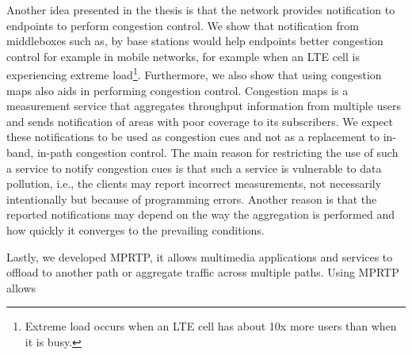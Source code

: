 Another idea presented in the thesis is that the network provides notification
to endpoints to perform congestion control. We show that notification from
middleboxes such as, by base stations would help endpoints better congestion
control for example in mobile networks, for example when an LTE cell is
experiencing extreme load\footnote{Extreme load occurs when an LTE cell has
about 10x more users than when it is busy.}. Furthermore, we also show that
using congestion maps also aids in performing congestion control. Congestion
maps is a measurement service that aggregates throughput information from
multiple users and sends notification of areas with poor coverage to its
subscribers. We expect these notifications to be used as congestion cues and
not as a replacement to in-band, in-path congestion control. The main reason
for restricting the use of such a service to notify congestion cues is that
such a service is vulnerable to data pollution, i.e., the clients may report
incorrect measurements, not necessarily intentionally but because of
programming errors. Another reason is that the reported notifications may
depend on the way the aggregation is performed and how quickly it converges to
the prevailing conditions.

Lastly, we developed MPRTP, it allows multimedia applications and services to
offload to another path or aggregate traffic across  multiple paths. Using
MPRTP allows




